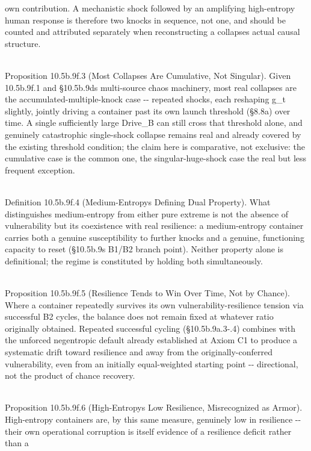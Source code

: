 \documentclass[
]{article}
\begin{document}
own contribution. A mechanistic shock followed by an amplifying
high-entropy human response is therefore two knocks in sequence, not
one, and should be counted and attributed separately when reconstructing
a collapse\textquotesingle s actual causal structure.\\
\strut \\
Proposition 10.5b.9f.3 (Most Collapses Are Cumulative, Not Singular).
Given 10.5b.9f.1 and §10.5b.9d\textquotesingle s multi-source chaos
machinery, most real collapses are the accumulated-multiple-knock case
-\/- repeated shocks, each reshaping g\_t slightly, jointly driving a
container past its own launch threshold (§8.8a) over time. A single
sufficiently large Drive\_B can still cross that threshold alone, and
genuinely catastrophic single-shock collapse remains real and already
covered by the existing threshold condition; the claim here is
comparative, not exclusive: the cumulative case is the common one, the
singular-huge-shock case the real but less frequent exception.\\
\strut \\
Definition 10.5b.9f.4 (Medium-Entropy\textquotesingle s Defining Dual
Property). What distinguishes medium-entropy from either pure extreme is
not the absence of vulnerability but its coexistence with real
resilience: a medium-entropy container carries both a genuine
susceptibility to further knocks and a genuine, functioning capacity to
reset (§10.5b.9\textquotesingle s B1/B2 branch point). Neither property
alone is definitional; the regime is constituted by holding both
simultaneously.\\
\strut \\
Proposition 10.5b.9f.5 (Resilience Tends to Win Over Time, Not by
Chance). Where a container repeatedly survives its own
vulnerability-resilience tension via successful B2 cycles, the balance
does not remain fixed at whatever ratio originally obtained. Repeated
successful cycling (§10.5b.9a.3-.4) combines with the unforced
negentropic default already established at Axiom C1 to produce a
systematic drift toward resilience and away from the
originally-conferred vulnerability, even from an initially
equal-weighted starting point -\/- directional, not the product of
chance recovery.\\
\strut \\
Proposition 10.5b.9f.6 (High-Entropy\textquotesingle s Low Resilience,
Misrecognized as Armor). High-entropy containers are, by this same
measure, genuinely low in resilience -\/- their own operational
corruption is itself evidence of a resilience deficit rather than a
\end{document}
